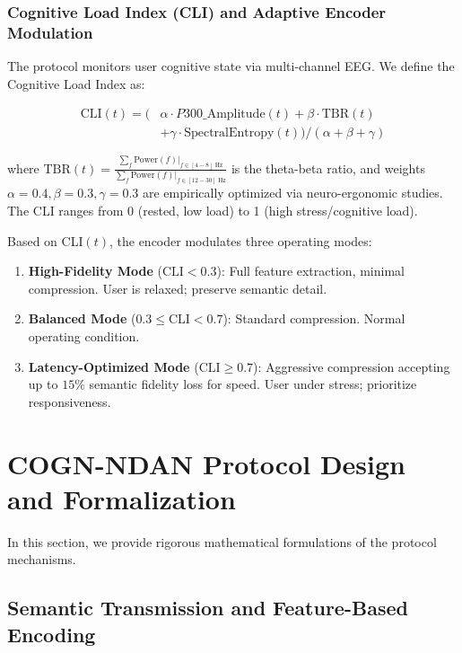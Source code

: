 \documentclass{BVP_CINC}
\begin{document}
\subsubsection{Cognitive Load Index (CLI) and Adaptive Encoder Modulation}
The protocol monitors user cognitive state via multi-channel EEG. We define the Cognitive Load Index as:

\begin{equation}
\begin{aligned}
\text{CLI}(t) = \big(&\alpha \cdot P300\_\text{Amplitude}(t) + \beta \cdot \text{TBR}(t)\\
&+ \gamma \cdot \text{SpectralEntropy}(t)\big)/(\alpha + \beta + \gamma)
\end{aligned}
\end{equation}

where $\text{TBR}(t) = \frac{\sum_f \text{Power}(f) |_{f \in [4-8] \text{ Hz}}}{\sum_f \text{Power}(f) |_{f \in [12-30] \text{ Hz}}}$ is the theta-beta ratio, and weights $\alpha=0.4, \beta=0.3, \gamma=0.3$ are empirically optimized via neuro-ergonomic studies. The CLI ranges from 0 (rested, low load) to 1 (high stress/cognitive load).

Based on CLI$(t)$, the encoder modulates three operating modes:
\begin{enumerate}
    \item \textbf{High-Fidelity Mode} ($\text{CLI} < 0.3$): Full feature extraction, minimal compression. User is relaxed; preserve semantic detail.
    \item \textbf{Balanced Mode} ($0.3 \leq \text{CLI} < 0.7$): Standard compression. Normal operating condition.
    \item \textbf{Latency-Optimized Mode} ($\text{CLI} \geq 0.7$): Aggressive compression accepting up to $15\%$ semantic fidelity loss for speed. User under stress; prioritize responsiveness.
\end{enumerate}

\section{COGN-NDAN Protocol Design and Formalization}

In this section, we provide rigorous mathematical formulations of the protocol mechanisms.

\subsection{Semantic Transmission and Feature-Based Encoding}
\end{document}
